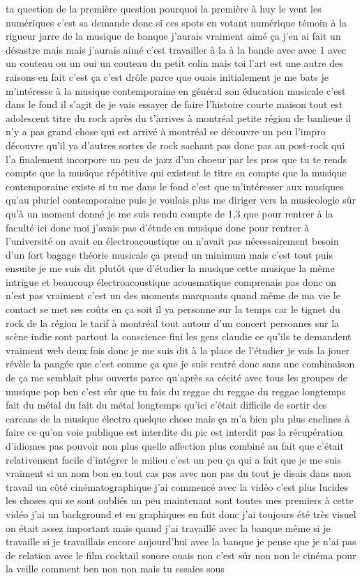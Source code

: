ta question de la première question pourquoi la première à huy le vent les numériques c'est sa demande donc si ces spots en votant numérique témoin à la rigueur jarre de la musique de banque j'aurais vraiment aimé ça j'en ai fait un désastre mais mais j'aurais aimé c'est travailler à la à la bande avec avec 1 avec un couteau ou un oui un couteau du petit colin mais toi l'art est une autre des raisons en fait c'est ça c'est drôle parce que ouais initialement je me bats je m'intéresse à la musique contemporaine en général son éducation musicale c'est dans le fond il s'agit de je vais essayer de faire l'histoire courte maison tout est adolescent titre du rock après du t'arrives à montréal petite région de banlieue il n'y a pas grand chose qui est arrivé à montréal se découvre un peu l'impro découvre qu'il ya d'autres sortes de rock sachant pas donc pas au post-rock qui l'a finalement incorpore un peu de jazz d'un choeur par les pros que tu te rends compte que la musique répétitive qui existent le titre en compte que la musique contemporaine existe si tu me dans le fond c'est que m'intéresser aux musiques qu'au pluriel contemporaine puis je voulais plus me diriger vers la musicologie sûr qu'à un moment donné je me suis rendu compte de 1,3 que pour rentrer à la faculté ici donc moi j'avais pas d'étude en musique donc pour rentrer à l'université on avait en électroacoustique on n'avait pas nécessairement besoin d'un fort bagage théorie musicale ça prend un minimum mais c'est tout puis ensuite je me suis dit plutôt que d'étudier la musique cette musique la même intrigue et beaucoup électroacoustique acousmatique comprenais pas donc on n'est pas vraiment c'est un des moments marquants quand même de ma vie le contact se met ses coûts en ça soit il ya personne sur la temps car le tignet du rock de la région le tarif à montréal tout autour d'un concert personnes sur la scène indie sont partout la conscience fini les gens claudie ce qu'ils te demandent vraiment web deux fois donc je me suis dit à la place de l'étudier je vais la jouer révèle la pangée que c'est comme ça que je suis rentré donc sans une combinaison de ça me semblait plus ouverts parce qu'après sa cécité avec tous les groupes de musique pop ben c'est sûr que tu fais du reggae du reggae du reggae longtemps fait du métal du fait du métal longtemps qu'ici c'était difficile de sortir des carcans de la musique électro quelque chose mais ça m'a bien plu plus enclines à faire ce qu'on voie publique est interdite du pic est interdit pas la récupération d'idiomes pas pouvoir non plus quelle affection plus combiné au fait que c'était relativement facile d'intégrer le milieu c'est un peu ça qui a fait que je me suis vraiment si un nom bon en tout cas pas avec non pas du tout je disais dans mon travail un côté cinématographique j'ai commencé avec la vidéo c'est plus lucides les choses qui se sont oubliés un peu maintenant sont toutes mes premiers à cette vidéo j'ai un background et en graphiques en fait donc j'ai toujours été très visuel on était assez important mais quand j'ai travaillé avec la banque même si je travaille si je travaillais encore aujourd'hui avec la banque je pense que je n'ai pas de relation avec le film cocktail sonore ouais non c'est sûr non non le cinéma pour la veille comment ben non non mais tu essaies sous 
